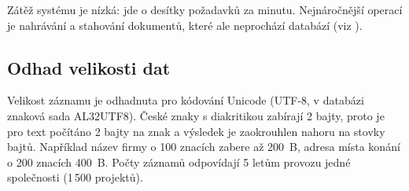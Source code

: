 Zátěž systému je nízká: jde o desítky požadavků za minutu. Nejnáročnější operací je nahrávání a stahování dokumentů, které ale neprochází databází (viz ).

\subsection{Odhad velikosti dat}

Velikost záznamu je odhadnuta pro kódování Unicode (UTF-8, v databázi znaková sada AL32UTF8). České znaky s diakritikou zabírají 2 bajty, proto je pro text počítáno 2 bajty na znak a výsledek je zaokrouhlen nahoru na stovky bajtů. Například název firmy o 100 znacích zabere až 200~B, adresa místa konání o 200 znacích 400~B. Počty záznamů odpovídají 5 letům provozu jedné společnosti (1\,500 projektů).

